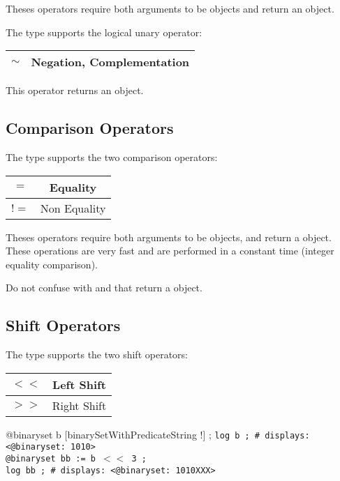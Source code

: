 Theses operators require both arguments to be  objects and return an  object.\newline


The  type supports the logical unary operator:\newline

\begin{tabular}{|c|c|}
\hline
$\sim$ & Negation, Complementation \\
\hline
\end{tabular}

This operator returns an  object.







\subsection{Comparison Operators}

The  type supports the two comparison operators:\newline

\begin{tabular}{|c|c|}
\hline
$=$ & Equality \\
\hline
$!=$ & Non Equality \\
\hline
\end{tabular}

Theses operators require both arguments to be  objects, and return a  object. These operations are very fast and are performed in a constant time (integer equality comparison).

Do not confuse with  and  that return a   object.







\subsection{Shift Operators}

The  type supports the two shift operators:\newline

\begin{tabular}{|c|c|}
\hline
$<<$ & Left Shift \\
\hline
$>>$ & Right Shift \\
\hline
\end{tabular}

\exempleUneLigne
{}
{@binaryset b [binarySetWithPredicateString !\textquotedbl] ;}
\texttt{log b ; \# displays: <@binaryset:~1010>}\\
\texttt{@binaryset bb := b $<<$ 3 ;}\\
\texttt{log bb ; \# displays: <@binaryset:~1010XXX>}\\


